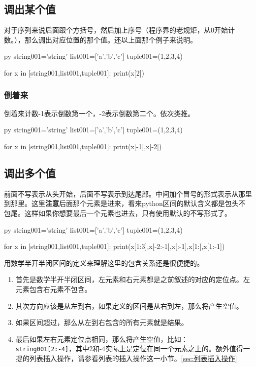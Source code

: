 \documentclass[12pt,oneside]{book}
\begin{document}
\begin{common-format}
\subsection{调出某个值}
对于序列来说后面跟个方括号，然后加上序号（程序界的老规矩，从0开始计数。），那么调出对应位置的那个值。还以上面那个例子来说明。
\begin{xverbatim}[129]{py}
string001='string'
list001=['a','b','c']
tuple001=(1,2,3,4)

for x in [string001,list001,tuple001]:
    print(x[2])
\end{xverbatim}

\subsubsection{倒着来}
倒着来计数-1表示倒数第一个，-2表示倒数第二个。依次类推。
\begin{xverbatim}[129]{py}
string001='string'
list001=['a','b','c']
tuple001=(1,2,3,4)

for x in [string001,list001,tuple001]:
    print(x[-1],x[-2])
\end{xverbatim}

\subsection{调出多个值}
\label{sec:调出多个值}
前面不写表示从头开始，后面不写表示到达尾部。中间加个冒号的形式表示从那里到那里。这里\textbf{注意}后面那个元素是进来，看来python区间的默认含义都是包头不包尾。这样如果你想要最后一个元素也进去，只有使用默认的不写形式了。
\begin{xverbatim}[129]{py}
string001='string'
list001=['a','b','c']
tuple001=(1,2,3,4)

for x in [string001,list001,tuple001]:
    print(x[1:3],x[-2:-1],x[:-1],x[1:],x[1:-1])
\end{xverbatim}
用数学半开半闭区间的定义来理解这里的包含关系还是很便捷的。
\begin{enumerate}
\item 首先是数学半开半闭区间，左元素和右元素都是之前叙述的对应的定位点。左元素包含右元素不包含。
\item 其次方向应该是从左到右，如果定义的区间是从右到左，那么将产生空值。
\item 如果区间超过，那么从左到右包含的所有元素就是结果。
\item 最后如果左右元素定位点相同，那么将产生空值，比如：\\
\verb+string001[2:-4]+，其中2和-4实际上是定位在同一个元素之上的。额外值得一提的列表插入操作，请参看列表的插入操作这一小节。\ref{sec:列表插入操作}
\end{enumerate}



\end{common-format}
\end{document}
